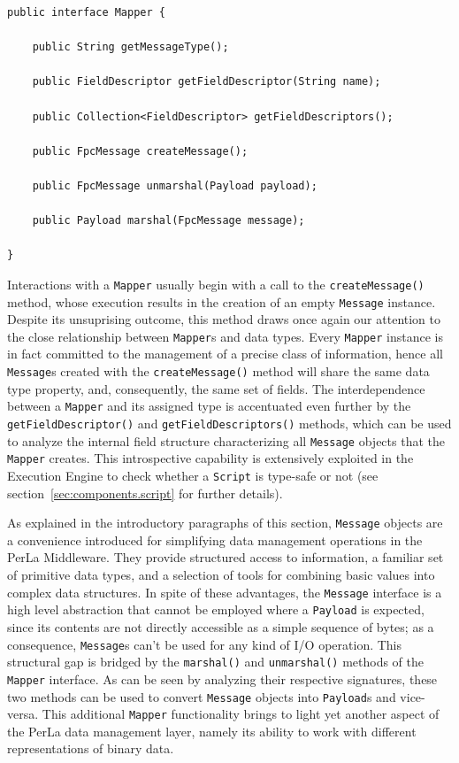\lstset{language=Java}
\begin{lstlisting}[float,floatplacement=!hbt,caption=The Mapper
interface,label={lst:mapper}]
public interface Mapper {

    public String getMessageType();

    public FieldDescriptor getFieldDescriptor(String name);

    public Collection<FieldDescriptor> getFieldDescriptors();

    public FpcMessage createMessage();

    public FpcMessage unmarshal(Payload payload);

    public Payload marshal(FpcMessage message);

}
\end{lstlisting}

Interactions with a \texttt{Mapper} usually begin with a call to the
\texttt{createMessage()} method, whose execution results in the creation of an
empty \texttt{Message} instance. Despite its unsuprising outcome, this method
draws once again our attention to the close relationship between
\texttt{Mapper}s and data types. Every \texttt{Mapper} instance is in fact
committed to the management of a precise class of information, hence all
\texttt{Message}s created with the \texttt{createMessage()} method will share
the same data type property, and, consequently, the same set of fields. The
interdependence between a \texttt{Mapper} and its assigned type is accentuated
even further by the \texttt{getFieldDescriptor()} and
\texttt{getFieldDescriptors()} methods, which can be used to analyze the
internal field structure characterizing all \texttt{Message} objects that the
\texttt{Mapper} creates. This introspective capability is extensively exploited
in the Execution Engine to check whether a \texttt{Script} is type-safe or not
(see section~\ref{sec:components.script} for further details).

As explained in the introductory paragraphs of this section, \texttt{Message}
objects are a convenience introduced for simplifying data management operations
in the PerLa Middleware. They provide structured access to information, a
familiar set of primitive data types, and a selection of tools for combining
basic values into complex data structures. In spite of these advantages, the
\texttt{Message} interface is a high level abstraction that cannot be employed
where a \texttt{Payload} is expected, since its contents are not directly
accessible as a simple sequence of bytes; as a consequence, \texttt{Message}s
can't be used for any kind of I/O operation. This structural gap is bridged by
the \texttt{marshal()} and \texttt{unmarshal()} methods of the \texttt{Mapper}
interface. As can be seen by analyzing their respective signatures, these two
methods can be used to convert \texttt{Message} objects into \texttt{Payload}s
and vice-versa. This additional \texttt{Mapper} functionality brings to light
yet another aspect of the PerLa data management layer, namely its ability to
work with different representations of binary data.

